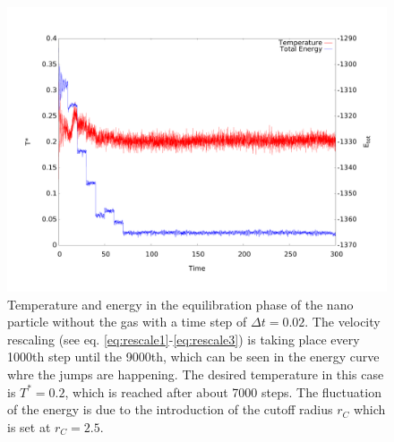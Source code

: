 \documentclass[12pt]{article}
\begin{document}
\begin{figure}[h]
    \begin{center}
        \includegraphics[scale=0.3]{images/verlet_output_te.pdf}
        \caption{Temperature and energy in the equilibration phase of the nano particle without the gas with a time step of
            $\Delta t = 0.02$. The velocity rescaling (see eq. 
        \eqref{eq:rescale1}-\eqref{eq:rescale3}) is taking place every 1000th step until the 9000th, which can be seen in the energy curve whre the
    jumps are happening. The desired temperature in this case is $T^* = 0.2$, which is reached after about 7000 steps. The fluctuation of the energy
    is due to the introduction of the cutoff radius $r_C$ which is set at $r_C = 2.5$.}
        \label{fig:energystart}
    \end{center}
\end{figure}
\end{document}

